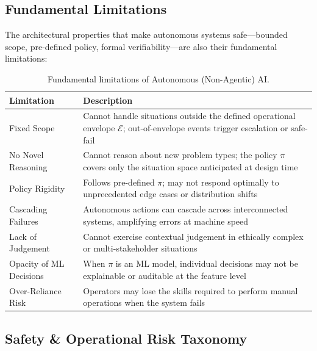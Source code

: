 \documentclass[12pt, a4paper]{article}
\begin{document}
\subsection{Fundamental Limitations}
The architectural properties that make autonomous systems safe---bounded scope, pre-defined policy, formal verifiability---are also their fundamental limitations:

\begin{table}[ht]
\centering
\caption{Fundamental limitations of Autonomous (Non-Agentic) AI.}
\label{tab:limitations}
\begin{tabular}{p{3.5cm}p{9.5cm}}
\toprule
\textbf{Limitation} & \textbf{Description} \\
\midrule
Fixed Scope & Cannot handle situations outside the defined operational envelope $\mathcal{E}$; out-of-envelope events trigger escalation or safe-fail \\
No Novel Reasoning & Cannot reason about new problem types; the policy $\pi$ covers only the situation space anticipated at design time \\
Policy Rigidity & Follows pre-defined $\pi$; may not respond optimally to unprecedented edge cases or distribution shifts \\
Cascading Failures & Autonomous actions can cascade across interconnected systems, amplifying errors at machine speed \\
Lack of Judgement & Cannot exercise contextual judgement in ethically complex or multi-stakeholder situations \\
Opacity of ML Decisions & When $\pi$ is an ML model, individual decisions may not be explainable or auditable at the feature level \\
Over-Reliance Risk & Operators may lose the skills required to perform manual operations when the system fails \\
\bottomrule
\end{tabular}
\end{table}

\subsection{Safety \& Operational Risk Taxonomy}
\end{document}
